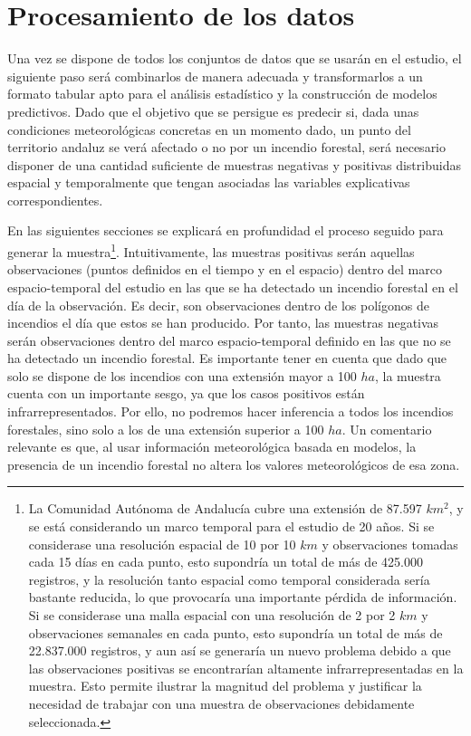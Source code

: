 \documentclass[12pt,a4paper,]{book}
\let\rmarkdownfootnote\footnote%
\def\footnote{\protect\rmarkdownfootnote}
\numberwithin{dummy}{section}
\theoremstyle{ocrenumbox}
\theoremstyle{blacknumex}
\theoremstyle{blacknumbox}
\theoremstyle{ocrenum}
\theoremstyle{ocrenum}
\begin{document}
\hypertarget{procesamiento-de-los-datos}{%
\section{Procesamiento de los datos}\label{procesamiento-de-los-datos}}

Una vez se dispone de todos los conjuntos de datos que se usarán en el
estudio, el siguiente paso será combinarlos de manera adecuada y
transformarlos a un formato tabular apto para el análisis estadístico y
la construcción de modelos predictivos. Dado que el objetivo que se
persigue es predecir si, dada unas condiciones meteorológicas concretas
en un momento dado, un punto del territorio andaluz se verá afectado o
no por un incendio forestal, será necesario disponer de una cantidad
suficiente de muestras negativas y positivas distribuidas espacial y
temporalmente que tengan asociadas las variables explicativas
correspondientes.

En las siguientes secciones se explicará en profundidad el proceso
seguido para generar la muestra\footnote{La Comunidad Autónoma de
  Andalucía cubre una extensión de 87.597 \(km^2\), y se está
  considerando un marco temporal para el estudio de 20 años. Si se
  considerase una resolución espacial de 10 por 10 \(km\) y
  observaciones tomadas cada 15 días en cada punto, esto supondría un
  total de más de 425.000 registros, y la resolución tanto espacial como
  temporal considerada sería bastante reducida, lo que provocaría una
  importante pérdida de información. Si se considerase una malla
  espacial con una resolución de 2 por 2 \(km\) y observaciones
  semanales en cada punto, esto supondría un total de más de 22.837.000
  registros, y aun así se generaría un nuevo problema debido a que las
  observaciones positivas se encontrarían altamente infrarrepresentadas
  en la muestra. Esto permite ilustrar la magnitud del problema y
  justificar la necesidad de trabajar con una muestra de observaciones
  debidamente seleccionada.}. Intuitivamente, las muestras positivas
serán aquellas observaciones (puntos definidos en el tiempo y en el
espacio) dentro del marco espacio-temporal del estudio en las que se ha
detectado un incendio forestal en el día de la observación. Es decir,
son observaciones dentro de los polígonos de incendios el día que estos
se han producido. Por tanto, las muestras negativas serán observaciones
dentro del marco espacio-temporal definido en las que no se ha detectado
un incendio forestal. Es importante tener en cuenta que dado que solo se
dispone de los incendios con una extensión mayor a 100 \(ha\), la
muestra cuenta con un importante sesgo, ya que los casos positivos están
infrarrepresentados. Por ello, no podremos hacer inferencia a todos los
incendios forestales, sino solo a los de una extensión superior a 100
\(ha\). Un comentario relevante es que, al usar información
meteorológica basada en modelos, la presencia de un incendio forestal no
altera los valores meteorológicos de esa zona.
\end{document}
